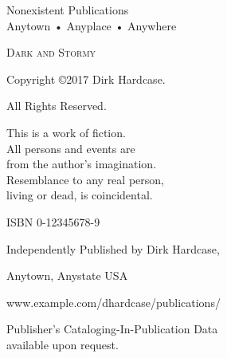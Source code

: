 \documentclass{novel} %
\begin{document}
\frontmatter

\thispagestyle{empty}
\vspace*{6\nbs}
\hfill{}\par
\vspace{\nbs}
\hfill{}\par
\clearpage

\thispagestyle{empty}
\null
\clearpage

\thispagestyle{empty}
\vspace*{5\nbs}
\begin{center}
\par
\vspace{2\nbs}
\par
\vspace{1.5\nbs}
\par
\vspace{4\nbs}
\vspace{4\nbs}
{\theAuthor}
\vfill
{ Nonexistent Publications\\
Anytown • Anyplace • Anywhere}\par

\end{center}
\clearpage


\thispagestyle{empty}
\begin{center}
\itshape{
\null
\vfill
\textsc{Dark and Stormy}\par
Copyright ©2017 Dirk Hardcase.\par %
All Rights Reserved.\par %
\null
This is a work of fiction.\\
All persons and events are\\
from the author's imagination.\\
Resemblance to any real person,\\
living or dead, is coincidental.\par %
\null
ISBN 0-12345678-9\par %
\null

Independently Published by Dirk Hardcase,\par %
Anytown, Anystate USA\par %
www.example.com/dhardcase/publications/\par %
\null
Publisher's Cataloging-In-Publication Data\\
available upon request.\par
} %
\end{center}
\clearpage
\end{document}

